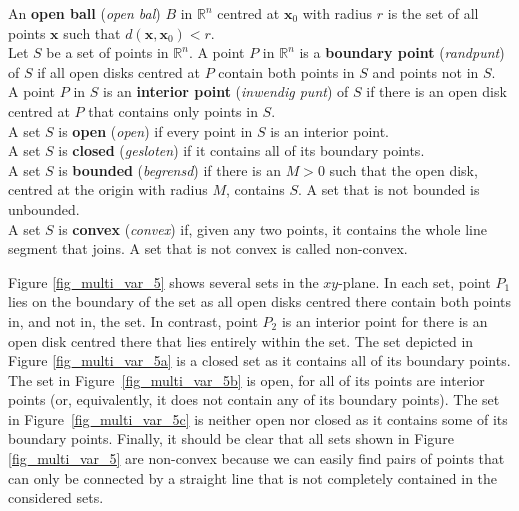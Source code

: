 \begin{definition}\label{def:open}
An \textbf{open ball} (\textit{open bal}) $B$ in $\mathbb{R}^n$ centred at $\mathbf{x}_0$ with radius $r$ is the set of all points $\mathbf{x}$ such that $d(\mathbf{x},\mathbf{x}_0) < r$. \\[0.2cm]
Let $S$ be a set of points in $\mathbb{R}^n$. A point $P$ in $\mathbb{R}^n$ is a \textbf{boundary point} (\textit{randpunt}) of $S$  if all open disks centred at $P$ contain both points in $S$ and points not in $S$.\\[0.2cm]
A point $P$ in $S$ is an \textbf{interior point} (\textit{inwendig punt}) of $S$ if there is an open disk centred at $P$ that contains only points in $S$. \\[0.2cm]
A set $S$ is \textbf{open} (\textit{open}) if every point in $S$ is an interior point.\\[0.2cm]
A set $S$ is \textbf{closed} (\textit{gesloten}) if it contains all of its boundary points.\\[0.2cm]
A set $S$ is \textbf{bounded} (\textit{begrensd}) if there is an $M>0$ such that the open disk, centred at the origin with radius $M$, contains $S$. A set that is not bounded is unbounded.\\
A set $S$ is \textbf{convex} (\textit{convex}) if, given any two points, it contains the whole line segment that joins. A set that is not convex is called non-convex.


\end{definition}
\fi



Figure \ref{fig_multi_var_5} shows several sets in the $xy$-plane. In each set, point $P_1$ lies on the boundary of the set as all open disks centred there contain both points in, and not in, the set. In contrast, point $P_2$ is an interior point for there is an open disk centred there that lies entirely within the set. The set depicted in Figure \ref{fig_multi_var_5a} is a closed set as it contains all of its boundary points. The set in Figure~\ref{fig_multi_var_5b} is open, for all of its points are interior points (or, equivalently, it does not contain any of its boundary points). The set in Figure~\ref{fig_multi_var_5c} is neither open nor closed as it contains  some of its boundary points. Finally, it should be clear that all sets shown in Figure \ref{fig_multi_var_5} are non-convex because we can easily find pairs of points that can only be connected by a straight line that is not completely contained in the considered sets. 

